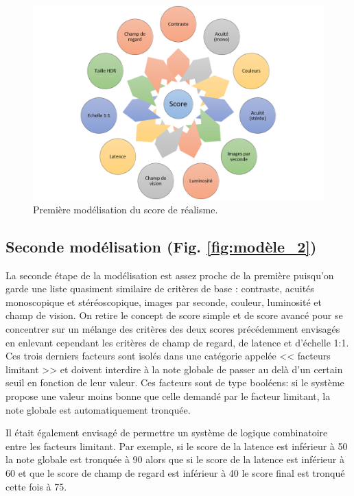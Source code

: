 	\begin{figure}
		\centering
		\includegraphics[scale=.8]{Figures/Modele1}
		\caption{Première modélisation du score de réalisme.}
		\label{fig:modèle_1}
	\end{figure}
	
	\subsection{Seconde modélisation (Fig. \ref{fig:modèle_2})}
	\par La seconde étape de la modélisation est assez proche de la première puisqu'on garde une liste quasiment similaire de critères de base : contraste, acuités monoscopique et stéréoscopique, images par seconde, couleur, luminosité et champ de vision. On retire le concept de score simple et de score avancé pour se concentrer sur un mélange des critères des deux scores précédemment envisagés en enlevant cependant les critères de champ de regard, de latence et d'échelle 1:1. Ces trois derniers facteurs sont isolés dans une catégorie appelée << facteurs limitant >> et doivent interdire à la note globale de passer au delà d'un certain seuil en fonction de leur valeur. Ces facteurs sont de type booléens: si le système propose une valeur moins bonne que celle demandé par le facteur limitant, la note globale est automatiquement tronquée.
	
	\par Il était également envisagé de permettre un système de logique combinatoire entre les facteurs limitant. Par exemple, si le score de la latence est inférieur à 50 la note globale est tronquée à 90 alors que si le score de la latence est inférieur à 60 et que le score de champ de regard est inférieur à 40 le score final est tronqué cette fois à 75.
	
